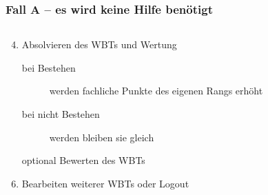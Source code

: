 \documentclass[xcolor=dvipsnames, utf8]{beamer}
\begin{document}
\begin{frame}
\frametitle{Fall A -- es wird keine Hilfe benötigt}
\begin{columns}
\begin{column}{7cm}
\begin{enumerate}
  \setcounter{enumi}{3}
  \item Absolvieren des WBTs und Wertung\begin{description}
  \item[bei Bestehen] werden fachliche Punkte des eigenen Rangs erhöht
  \item[bei nicht Bestehen] werden bleiben sie gleich\end{description}
  \item[optional] Bewerten des WBTs
  \item Bearbeiten weiterer WBTs oder Logout
\end{enumerate}
\end{column}
\begin{column}{3cm}
\end{column}
\end{columns}
\end{frame}
\end{document}

